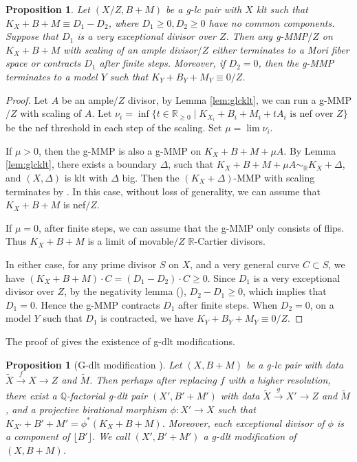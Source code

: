 \documentclass[11pt]{amsart}
\newcommand{\Rr}{\mathbb{R}}
\newcommand{\Qq}{\mathbb{Q}}
\newcommand{\lf}{\lfloor}
\newtheorem{proposition}[theorem]{Proposition}
\begin{document}
\begin{proposition}\label{prop: termination for very exceptional divisor}
	Let $(X/Z, B+M)$ be a g-lc pair with $X$ klt such that $K_X+B+M\equiv D_1-D_2$, where $D_1\geq 0,D_2\ge0$ have no common components. Suppose that $D_1$ is a very exceptional divisor over $Z$. Then any g-MMP$/Z$ on $K_X+B+M$ with scaling of an ample divisor$/Z$ either terminates to a Mori fiber space or contracts $D_1$ after finite steps. Moreover, if $D_2=0$, then the g-MMP terminates to a model $Y$ such that $K_Y+B_Y+M_Y \equiv 0/Z$.
\end{proposition}
\begin{proof}
	Let $A$ be an ample$/Z$ divisor, by Lemma \ref{lem:glcklt}, we can run a g-MMP$/Z$ with scaling of $A$. Let $\nu_i=\inf\{t \in\Rr_{\geq0} \mid K_{X_i}+B_i+M_i+tA_i \text{~is~nef~over~}Z\}$ be the nef threshold in each step of the scaling. Set $\mu = \lim \nu_i$. 
	
	If $\mu>0$, then the g-MMP is also a g-MMP on $K_X+B+M+\mu A$. By Lemma \ref{lem:glcklt}, there exists a boundary $\Delta$, such that $K_X+B+M+\mu A \sim_\Rr K_X+\Delta$, and $(X, \Delta)$ is klt with $\Delta$ big. Then the $(K_X+\Delta)$-MMP with scaling terminates by \cite[Corollary 1.4.2]{BCHM10}. In this case, without loss of generality, we can assume that $K_X+B+M$ is nef$/Z$.
	
	 If $\mu=0$, after finite steps, we can assume that the g-MMP only consists of flips. Thus $K_X+B+M$ is a limit of movable$/Z$ $\Rr$-Cartier divisors. 
	 
	 In either case, for any prime divisor $S$ on $X$, and a very general curve $C\subset S$, we have $(K_X+B+M)\cdot C =(D_1-D_2)\cdot C\geq 0$. Since $D_1$ is a very exceptional divisor over $Z$, by the negativity lemma (\cite[Lemma 3.3]{Birkar12}), $D_2-D_1 \geq 0$, which implies that $D_1=0$. Hence the g-MMP contracts $D_1$ after finite steps. When $D_2=0$, on a model $Y$ such that $D_1$ is contracted, we have $K_Y+B_Y+M_Y \equiv 0/Z$.
\end{proof}
The proof of \cite[Lemma 4.5]{BZ16} gives the existence of g-dlt modifications. 
\begin{proposition}[G-dlt modification {\cite[Lemma 4.5]{BZ16}}]\label{prop: dlt}
	Let $(X, B + M)$ be a g-lc pair with data $\tilde X \xrightarrow{f} X \to Z$ and $\tilde M$. Then perhaps after replacing $f$ with a higher resolution, there exist a $\Qq$-factorial g-dlt pair $(X', B' + M')$ with data $\tilde X \xrightarrow{g} X' \to Z$ and $\tilde M$, and a projective birational morphism $\phi: X' \to X$ such that $K_{X'}+B'+M' = \phi^*(K_{X}+B+M)$. Moreover, each exceptional divisor of $\phi$ is a component of $\lf B'\rfloor$. We call $(X', B' + M')$ a g-dlt modification of $(X,B+M)$.
\end{proposition}
\end{document}

